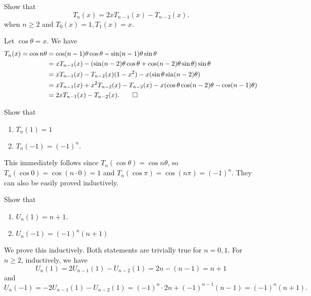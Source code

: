 		\begin{problem}
			\label{problem: recurrence of Chebyshev of the first kind}
			Show that
			\[ T_n(x) = 2xT_{n-1}(x) - T_{n-2}(x). \]
			when $n \ge 2$ and $T_0(x) = 1, T_1(x) = x$.
		\end{problem}
		\begin{solution*}
			Let $\cos \theta = x$. We have
			\begin{align*}
				T_n(x) = \cos n\theta &= \cos (n-1)\theta \cos \theta - \sin (n-1)\theta \sin \theta \\
					&= x T_{n-1}(x) - ( \sin (n-2)\theta \cos\theta + \cos (n-2)\theta \sin\theta ) \sin\theta \\
					&= x T_{n-1}(x) - T_{n-2}(x) (1-x^2) - x (\sin\theta \sin (n-2)\theta) \\
					&= x T_{n-1}(x) + x^2 T_{n-2}(x) - T_{n-2}(x) - x (\cos\theta \cos (n-2)\theta - \cos (n-1)\theta) \\
					&= 2x T_{n-1}(x) - T_{n-2}(x). \qedhere
			\end{align*}
		\end{solution*}

		\begin{problem}
			Show that
			\begin{enumerate}[label=(\alph*)]
				\item $T_n(1) = 1$ 
				\item $T_n(-1) = (-1)^n$.
			\end{enumerate}
		\end{problem}
		\begin{solution*}
			This immediately follows since $T_n(\cos\theta) = \cos n\theta$, so $T_n(\cos 0) = \cos (n\cdot 0) = 1$ and $T_n(\cos \pi) = \cos(n\pi) = (-1)^n$. They can also be easily proved inductively.
		\end{solution*}

		\begin{problem}
			Show that
			\begin{enumerate}[label=(\alph*)]
				\item $U_n(1) = n+1$.
				\item $U_n(-1) = (-1)^n (n+1)$
			\end{enumerate}
		\end{problem}
		\begin{solution*}
			We prove this inductively. Both statements are trivially true for $n=0,1$. For $n\ge 2$, inductively, we have
			\[ U_n(1) = 2U_{n-1}(1) - U_{n-2}(1) = 2n - (n-1) = n+1 \]
			and
			\[ U_n(-1) = -2U_{n-1}(1) - U_{n-2}(1) = (-1)^{n} \cdot 2n + (-1)^{n-1} (n-1) = (-1)^n (n+1). \]
		\end{solution*}


